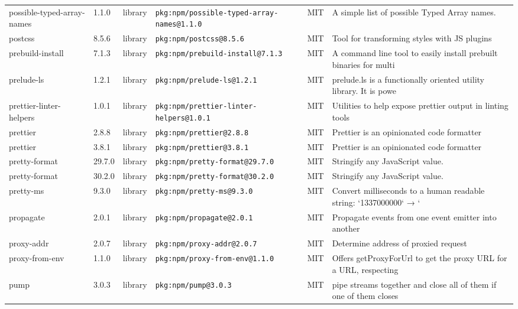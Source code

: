 \documentclass[11pt,a4paper]{article}
\begin{document}
\begin{longtable}{|p{4cm}|p{2cm}|p{1.6cm}|p{5cm}|p{1.5cm}|p{3.5cm}|}
\raggedright possible-typed-array-names & 1.1.0 & library & \small\texttt{pkg:npm/possible-typed-array-names@1.1.0} & MIT & \small A simple list of possible Typed Array names. \\
\raggedright postcss & 8.5.6 & library & \small\texttt{pkg:npm/postcss@8.5.6} & MIT & \small Tool for transforming styles with JS plugins \\
\raggedright prebuild-install & 7.1.3 & library & \small\texttt{pkg:npm/prebuild-install@7.1.3} & MIT & \small A command line tool to easily install prebuilt binaries for multi \\
\raggedright prelude-ls & 1.2.1 & library & \small\texttt{pkg:npm/prelude-ls@1.2.1} & MIT & \small prelude.ls is a functionally oriented utility library. It is powe \\
\raggedright prettier-linter-helpers & 1.0.1 & library & \small\texttt{pkg:npm/prettier-linter-helpers@1.0.1} & MIT & \small Utilities to help expose prettier output in linting tools \\
\raggedright prettier & 2.8.8 & library & \small\texttt{pkg:npm/prettier@2.8.8} & MIT & \small Prettier is an opinionated code formatter \\
\raggedright prettier & 3.8.1 & library & \small\texttt{pkg:npm/prettier@3.8.1} & MIT & \small Prettier is an opinionated code formatter \\
\raggedright pretty-format & 29.7.0 & library & \small\texttt{pkg:npm/pretty-format@29.7.0} & MIT & \small Stringify any JavaScript value. \\
\raggedright pretty-format & 30.2.0 & library & \small\texttt{pkg:npm/pretty-format@30.2.0} & MIT & \small Stringify any JavaScript value. \\
\raggedright pretty-ms & 9.3.0 & library & \small\texttt{pkg:npm/pretty-ms@9.3.0} & MIT & \small Convert milliseconds to a human readable string: `1337000000` → ` \\
\raggedright propagate & 2.0.1 & library & \small\texttt{pkg:npm/propagate@2.0.1} & MIT & \small Propagate events from one event emitter into another \\
\raggedright proxy-addr & 2.0.7 & library & \small\texttt{pkg:npm/proxy-addr@2.0.7} & MIT & \small Determine address of proxied request \\
\raggedright proxy-from-env & 1.1.0 & library & \small\texttt{pkg:npm/proxy-from-env@1.1.0} & MIT & \small Offers getProxyForUrl to get the proxy URL for a URL, respecting  \\
\raggedright pump & 3.0.3 & library & \small\texttt{pkg:npm/pump@3.0.3} & MIT & \small pipe streams together and close all of them if one of them closes \\

\end{longtable}
\end{document}
